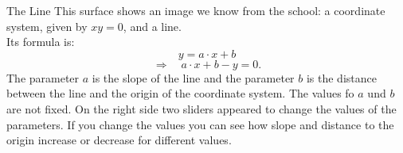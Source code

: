 \begin{surferPage}{The Line}
This surface shows an image we know from the school: a coordinate system, given by  $xy=0$, and a line. \\Its formula is:
\[y=a\cdot x + b\]
\[ \Rightarrow \quad a\cdot x +b -y=0.\]
The parameter $a$ is the slope of the line and the parameter $b$ is the distance between the line and the origin of the coordinate system.
\newline \newline
The values fo $a$ und $b$ are not fixed. On the right side two sliders appeared to change the values of the parameters. If you change the values you can see how slope and distance to the origin increase or decrease for different values.
\end{surferPage}
